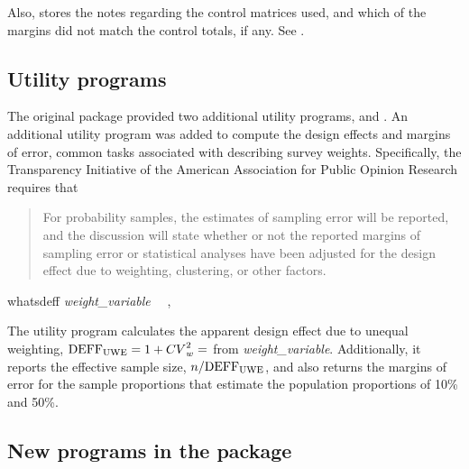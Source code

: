 Also,  stores the notes regarding the control matrices
used, and which of the margins did not match the control totals, if any.
See .

\subsection{Utility programs}
\label{subsec:utility}

The original package  provided two additional utility programs,
 and . An additional utility program 
was added to compute the design effects and margins of error, common tasks associated
with describing survey weights. Specifically, the Transparency Initiative
of the American Association for Public Opinion Research
\citep{aapor:2014:ti:terms}
requires that

\begin{quote}
For probability samples, the estimates of sampling error will be reported, and the discussion will state whether or not the reported margins of sampling error or statistical analyses have been adjusted for the design effect due to weighting, clustering, or other factors.
\end{quote}


\begin{stsyntax}
whatsdeff
{\it weight\_variable}
\optif\
\optin\
,
\end{stsyntax}

The utility program  calculates the apparent design effect due to unequal weighting,
${\rm DEFF_{UWE}}=1 + {CV}^2_w = $  from  {\it weight{\_}variable}.
Additionally, it reports the effective sample size, $n/{\rm DEFF_{UWE}}$, and also returns
the margins of error for the sample proportions that estimate the population proportions of
10\% and 50\%.

\noindent
\begin{stlog}
\nullskip
\end{stlog}

\subsection{New programs in the package}

